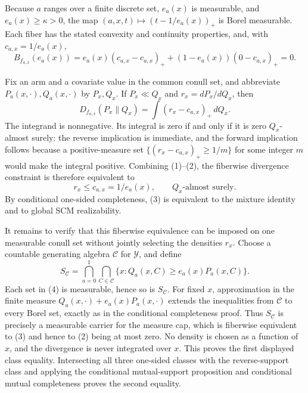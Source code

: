 Because \(a\) ranges over a finite discrete set, \(e_a(x)\) is measurable, and \(e_a(x)\ge\kappa>0\), the map \((a,x,t)\mapsto(t-1/e_a(x))_+\) is Borel measurable.  Each fiber has the stated convexity and continuity properties, and, with \(c_{a,x}=1/e_a(x)\),
\[
 B_{f_{a,x}}(e_a(x))
 =e_a(x)(c_{a,x}-c_{a,x})_++(1-e_a(x))(0-c_{a,x})_+=0. \tag{1}
\]

Fix an arm and a covariate value in the common conull set, and abbreviate \(P_a(x,\cdot),Q_a(x,\cdot)\) by \(P_x,Q_x\).  If \(P_x\ll Q_x\) and \(r_x=dP_x/dQ_x\), then
\[
 D_{f_{a,x}}(P_x\|Q_x)=\int(r_x-c_{a,x})_+\,dQ_x. \tag{2}
\]
The integrand is nonnegative.  Its integral is zero if and only if it is zero \(Q_x\)-almost surely: the reverse implication is immediate, and the forward implication follows because a positive-measure set \(\{(r_x-c_{a,x})_+\ge1/m\}\) for some integer \(m\) would make the integral positive.  Combining (1)--(2), the fiberwise divergence constraint is therefore equivalent to
\[
 r_x\le c_{a,x}=1/e_a(x),\qquad Q_x\text{-almost surely}. \tag{3}
\]
By conditional one-sided completeness, (3) is equivalent to the mixture identity and to global SCM realizability.

It remains to verify that this fiberwise equivalence can be imposed on one measurable conull set without jointly selecting the densities \(r_x\).  Choose a countable generating algebra \(\mathcal C\) for \(\mathcal Y\), and define
\[
 S_{\mathcal C}=\bigcap_{a=0}^1\bigcap_{C\in\mathcal C}
 \{x:Q_a(x,C)\ge e_a(x)P_a(x,C)\}. \tag{4}
\]
Each set in (4) is measurable, hence so is \(S_{\mathcal C}\).  For fixed \(x\), approximation in the finite measure \(Q_a(x,\cdot)+e_a(x)P_a(x,\cdot)\) extends the inequalities from \(\mathcal C\) to every Borel set, exactly as in the conditional completeness proof.  Thus \(S_{\mathcal C}\) is precisely a measurable carrier for the measure cap, which is fiberwise equivalent to (3) and hence to (2) being at most zero.  No density is chosen as a function of \(x\), and the divergence is never integrated over \(x\).  This proves the first displayed class equality.  Intersecting all three one-sided classes with the reverse-support class and applying the conditional mutual-support proposition and conditional mutual completeness proves the second equality.